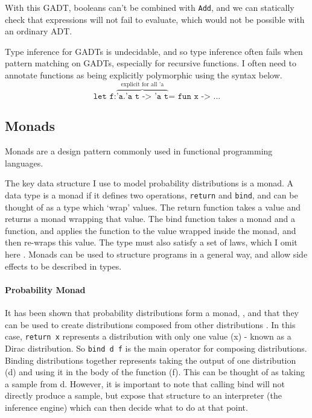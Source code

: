 With this GADT, booleans can't be combined with \texttt{Add}, and we can statically check that expressions will not fail to evaluate, which would not be possible with an ordinary ADT.
	
Type inference for GADTs is undecidable, and so type inference often fails when pattern matching on GADTs, especially for recursive functions. I often need to annotate functions as being explicitly polymorphic using the syntax below.
\[
	\texttt{let f:}\overbrace{\texttt{'a.'a t -> 'a t}}^{\text{explicit for all 'a}}\texttt{= fun x -> ...}
\]
\subsection{Monads}
Monads are a design pattern commonly used in functional programming languages.
	
The key data structure I use to model probability distributions is a monad. A data type is a monad if it defines two operations, \texttt{return} and \texttt{bind}, and can be thought of as a type which `wrap' values. The return function takes a value and returns a monad wrapping that value. The bind function takes a monad and a function, and applies the function to the value wrapped inside the monad, and then re-wraps this value. The type must also satisfy a set of laws, which I omit here \cite{wadler1990comprehending}. Monads can be used to structure programs in a general way, and allow side effects to be described in types.
	
\paragraph{Probability Monad} \label{sec:prep-monad}
It has been shown that probability distributions form a monad, \cite{giry1982categorical, jones1989probabilistic}, and that they can be used to create distributions composed from other distributions \cite{ramsey2002stochastic}. In this case, \texttt{return x} represents a distribution with only one value (x) - known as a Dirac distribution. So \texttt{bind d f} is the main operator for composing distributions. Binding distributions together represents taking the output of one distribution (d) and using it in the body of the function (f). This can be thought of as taking a sample from d. However, it is important to note that calling bind will not directly produce a sample, but expose that structure to an interpreter (the inference engine) which can then decide what to do at that point.
	
